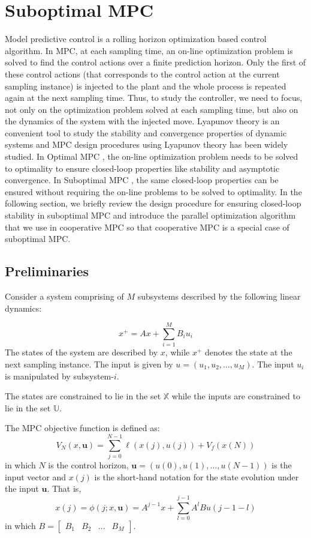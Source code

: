 \documentclass[10pt]{article}
\newcommand{\bu}{\mathbf{u}}
\theoremstyle{definition}
\begin{document}
\section{Suboptimal MPC}
\label{sec:suboptimal}
Model predictive control is a rolling horizon optimization
based control algorithm. In MPC, at each sampling time, an on-line
optimization problem is solved to find the control actions over a
finite prediction horizon. Only the first of these control actions (that corresponds to the control
action at the current sampling instance) is injected to the plant and
the whole process is repeated again at the next sampling time. Thus,
to study the controller, we need to focus, not only on the
optimization problem solved at each sampling time, but also on the
dynamics of the system with the injected move. Lyapunov theory is an
convenient tool to study the stability and convergence properties of
dynamic systems and MPC design procedures using Lyapunov theory has
been widely studied. In Optimal MPC \citep[Chapter
  2]{rawlings:mayne:2009}, the on-line optimization problem needs to
be solved to optimality to ensure closed-loop properties like
stability and asymptotic convergence. In Suboptimal MPC
\citep{pannocchia:rawlings:wright:2011,scokaert:mayne:rawlings:1999},
the same closed-loop properties can be ensured without requiring
the on-line problems to be solved to optimality. In the following
section, we briefly review the design procedure for ensuring
closed-loop stability in suboptimal MPC and introduce the parallel
optimization algorithm that we use in cooperative MPC so that
cooperative MPC is a special case of suboptimal MPC.
 
\subsection{Preliminaries}
Consider a system comprising of $M$ subsystems described by the
following linear dynamics: 

\begin{equation}
\label{eq:model}
x^+ = Ax + \sum_{i=1}^{M} B_i u_i
\end{equation}
The states of the system are described by $x$, while $x^+$ denotes the
state at the next sampling instance. The input is given by $u =
(u_1,u_2,\ldots,u_M)$. The input $u_i$ is manipulated by subsystem-$i$.

The states are constrained to lie in the set $\mathbb{X}$ while the
inputs are constrained to lie in the set $\mathbb{U}$.

The MPC objective function is defined as:
\begin{equation}
\label{eq:VN0}
V_N(x,\bu) = \sum_{j=0}^{N-1}\ell(x(j),u(j)) + V_f(x(N))
\end{equation}
in which $N$ is the control horizon, $\bu = (u(0),u(1),\ldots,u(N-1))$
is the input vector and $x(j)$ is the short-hand notation for the
state evolution under the input $\bu$. That is,
 \[x(j) = \phi(j;x,\bu)=  A^{j-1}x +\sum_{l=0}^{j-1} A^lBu(j-1-l)\]
in which $B = \begin{bmatrix}B_1&B_2&\ldots&B_M\end{bmatrix}$.
\end{document}

